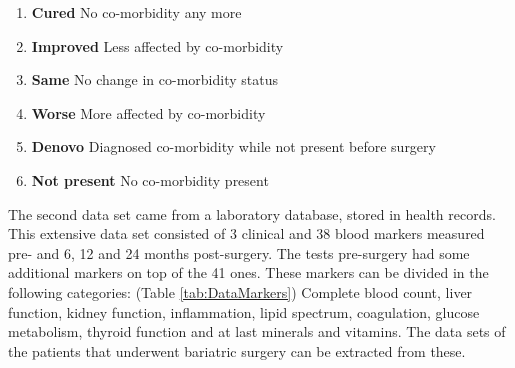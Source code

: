 \documentclass[10pt,a4paper]{article}
\begin{document}
	\begin{enumerate}
		\item \textbf{Cured} No co-morbidity any more		
		\item \textbf{Improved} Less affected by co-morbidity
		\item \textbf{Same} No change in co-morbidity status
		\item \textbf{Worse} More affected by co-morbidity
		\item \textbf{Denovo} Diagnosed co-morbidity while not present before surgery
		\item \textbf{Not present} No co-morbidity present				
	\end{enumerate}

	The second data set came from a laboratory database, stored in health records. This extensive data set consisted of 3 clinical and 38 blood markers measured pre- and 6, 12 and 24 months post-surgery. The tests pre-surgery had some additional markers on top of the 41 ones. These markers can be divided in the following categories: (Table \ref{tab:DataMarkers}) Complete blood count, liver function, kidney function, inflammation, lipid spectrum, coagulation, glucose metabolism, thyroid function and at last minerals and vitamins. The data sets of the patients that underwent bariatric surgery can be extracted from these. \cite{Deneer2017Thesis}
	
\end{document}
